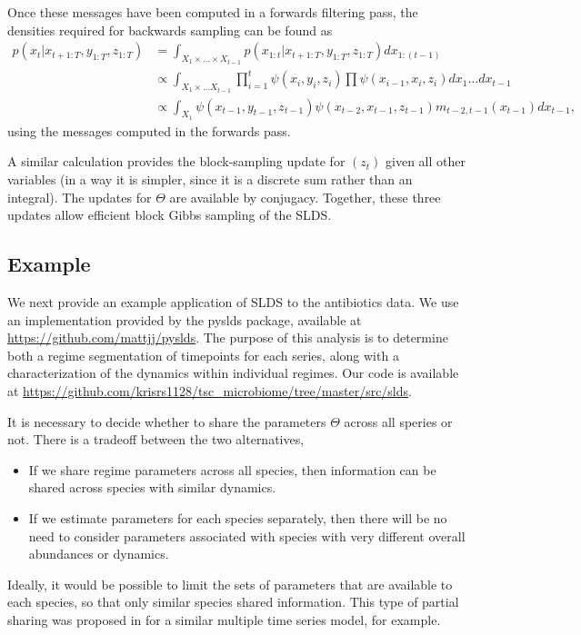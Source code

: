 \documentclass{article}
\begin{document}
Once these messages have been computed in a forwards filtering pass, the
densities required for backwards sampling can be found as
\begin{align*}
  p\left(x_t \vert x_{t + 1:T}, y_{1:T}, z_{1:T}\right) &=
  \int_{X_1 \times \dots \times X_{t - 1}} p\left(x_{1:t} \vert x_{t + 1: T}, y_{1:T}, z_{1:T}\right) dx_{1:(t - 1)} \\
  &\propto \int_{X_1 \times \dots X_{t - 1}} \prod_{i = 1}^{t} \psi\left(x_i, y_i, z_i\right) \prod \psi\left(x_{i - 1}, x_i, z_i\right) dx_{1} \dots dx_{t - 1} \\
  &\propto \int_{X_{1}} \psi\left(x_{t - 1}, y_{t - 1}, z_{t - 1}\right)\psi\left(x_{t - 2}, x_{t - 1}, z_{t - 1}\right) m_{t - 2, t - 1}\left(x_{t - 1}\right) d x_{t - 1},
\end{align*}
using the messages computed in the forwards pass.

A similar calculation provides the block-sampling update for
$\left(z_{t}\right)$ given all other variables (in a way it is simpler, since it
is a discrete sum rather than an integral). The updates for $\Theta$ are
available by conjugacy. Together, these three updates allow efficient block
Gibbs sampling of the SLDS.

\subsection{Example}
\label{subsec:slds_example}

We next provide an example application of SLDS to the antibiotics data. We use
an implementation provided by the pyslds package, available at
\url{https://github.com/mattjj/pyslds}. The purpose of this analysis is to
determine both a regime segmentation of timepoints for each series, along with a
characterization of the dynamics within individual regimes. Our code is
available at
\url{https://github.com/krisrs1128/tsc_microbiome/tree/master/src/slds}.

It is necessary to decide whether to share the parameters $\Theta$ across all
speries or not. There is a tradeoff between the two alternatives,
\begin{itemize}
\item If we share regime parameters across all species, then information can be
  shared across species with similar dynamics.
\item If we estimate parameters for each species separately, then there will be
  no need to consider parameters associated with species with very different
  overall abundances or dynamics.
\end{itemize}
Ideally, it would be possible to limit the sets of parameters that are available
to each species, so that only similar species shared information. This type of
partial sharing was proposed in \citep{fox2009sharing} for a similar multiple
time series model, for example.
\end{document}
